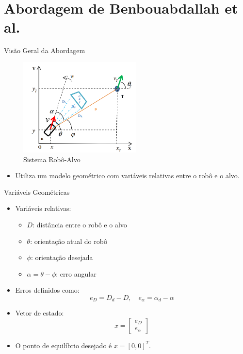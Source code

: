 \documentclass{beamer}
\begin{document}
\section{Abordagem de Benbouabdallah et al.}

\begin{frame}{Visão Geral da Abordagem}

\begin{figure}[h!]
    \centering
    \includegraphics[width=0.55\textwidth]{Figuras/Sistema_Robo_Albo_2.png}
    \caption{Sistema Robô-Alvo}
    \label{fig:Sistema_Robo_Alvo_2}
\end{figure}

  \begin{itemize}
    \item Utiliza um modelo geométrico com variáveis relativas entre o robô e o alvo.
  \end{itemize}
\end{frame}

\begin{frame}{Variáveis Geométricas}
  \begin{itemize}
    \item Variáveis relativas:
    \begin{itemize}
      \item $D$: distância entre o robô e o alvo
      \item $\theta$: orientação atual do robô
      \item $\phi$: orientação desejada
      \item $\alpha = \theta - \phi$: erro angular
    \end{itemize}
     \item Erros definidos como:
    \[
    e_D = D_d - D, \quad
    e_\alpha = \alpha_d - \alpha
    \]
    \item Vetor de estado:
    \[
    x = \begin{bmatrix} e_D \\ e_\alpha\end{bmatrix}
    \]
    \item O ponto de equilíbrio desejado é $x = [0, 0]^T$.
  \end{itemize}
\end{frame}
\end{document}
